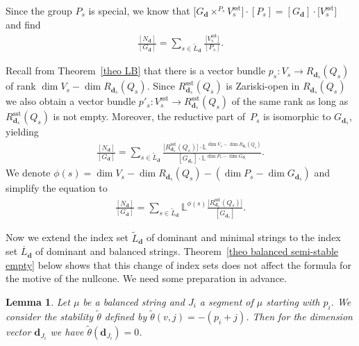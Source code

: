 \documentclass[10pt,a4paper]{amsart}
\numberwithin{equation}{section}
\newtheorem{Lemma}[Theorem]{Lemma}
\theoremstyle{definition}
\begin{document}
Since the group $P_s$ is special, we know that
$
\big[G_{\mathbf{d}} \times^{P_s} V_s^{\mathrm{sst}}\big] \cdot [P_s] = [G_{\mathbf{d}}] \cdot \big[V_s^{\mathrm{sst}}\big]
$
and find
\begin{align*}
\frac{[ N_{\mathbf{d}}]}{[ G_{\mathbf{d}}]} = \sum_{s \in \widetilde{L}_{\mathbf{d}}} \frac{\big[V_s^{\mathrm{sst}}\big]}{[P_s]} .
\end{align*}

Recall from Theorem~\ref{theo LB} that there is a vector bundle
$
p_s \colon V_s \rightarrow R_{\mathbf{d}_s} (Q_s)
$
 of rank $\dim V_s -\dim R_{\mathbf{d}_s}(Q_s)$. Since $R^{\mathrm{sst}}_{\mathbf{d}_s}(Q_s)$ is Zariski-open in $R_{\mathbf{d}_s} (Q_s)$ we also obtain a vector bundle
$
 p'_s\colon V_s^{\mathrm{sst}} \allowbreak\rightarrow R^{\mathrm{sst}}_{\mathbf{d}_s}(Q_s)
$
 of the same rank as long as $ R^{\mathrm{sst}}_{\mathbf{d}_s}(Q_s)$ is not empty. Moreover, the reductive part of~$P_s$ is isomorphic to $G_{\mathbf{d}_s}$, yielding
\begin{align*}
\frac{[ N_{\mathbf{d}}]}{[ G_{\mathbf{d}}]} =\sum_{s \in \widetilde{L}_{\mathbf{d}}} \frac{\big[R^{\mathrm{sst}}_{\mathbf{d}_s}(Q_s)\big] \cdot \mathbb{L}^{\dim V_s -\dim R_{\mathbf{d}_s}(Q_s)}}{[G_{\mathbf{d}_s}] \cdot \mathbb{L}^{\dim P_s - \dim G_{\mathbf{d}_s}}}.
\end{align*}
We denote $\phi(s) = \dim V_s -\dim R_{\mathbf{d}_s}(Q_s) -( \dim P_s - \dim G_{\mathbf{d}_s})$ and simplify the equation to
\begin{align} \label{formula motive}
\frac{[ N_{\mathbf{d}}]}{[ G_{\mathbf{d}}]} = \sum_{s \in {\widetilde{L}_{\mathbf{d}}}} \mathbb{L}^{\phi(s)} \frac{\big[R^{\mathrm{sst}}_{\mathbf{d}_s}(Q_s)\big]}{[G_{\mathbf{d}_s}]} .
\end{align}

Now we extend the index set $\widetilde{L}_{\mathbf{d}}$ of dominant and minimal strings to the index set $\overline{L}_{\mathbf{d}}$ of dominant and balanced strings. Theorem~\ref{theo balanced semi-stable empty} below shows that this change of index sets does not affect the formula for the motive of the nullcone. We need some preparation in advance.

\begin{Lemma} \label{lem balanc stab =0}
Let $\mu$ be a balanced string and $J_i$ a segment of $\mu$ starting with $p_i$. We consider the stability $\tilde{\theta}$ defined by $\tilde{\theta}(v,j) = -(p_i+j)$. Then for the dimension vector $\mathbf{d}_{J_i}$ we have $\tilde{\theta} (\mathbf{d}_{J_i})=0$.
\end{Lemma}
\end{document}
